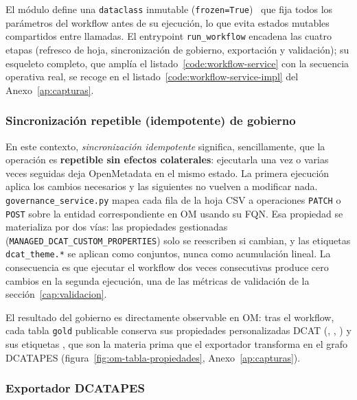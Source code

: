 El módulo  define una \texttt{dataclass} inmutable (\texttt{frozen=True})~\cite{pythonDataclasses} que fija todos los parámetros del workflow antes de su ejecución, lo que evita estados mutables compartidos entre llamadas. El entrypoint \texttt{run\_workflow} encadena las cuatro etapas (refresco de hoja, sincronización de gobierno, exportación y validación); su esqueleto completo, que amplía el listado~\ref{code:workflow-service} con la secuencia operativa real, se recoge en el listado~\ref{code:workflow-service-impl} del Anexo~\ref{ap:capturas}.

\subsubsection{Sincronización repetible (idempotente) de gobierno}

En este contexto, \emph{sincronización idempotente} significa, sencillamente, que la operación es \textbf{repetible sin efectos colaterales}: ejecutarla una vez o varias veces seguidas deja OpenMetadata en el mismo estado. La primera ejecución aplica los cambios necesarios y las siguientes no vuelven a modificar nada. \texttt{governance\_service.py} mapea cada fila de la hoja \ac{CSV} a operaciones \texttt{PATCH} o \texttt{POST} sobre la entidad correspondiente en \ac{OM} usando su \ac{FQN}. Esa propiedad se materializa por dos vías: las propiedades gestionadas (\texttt{MANAGED\_DCAT\_CUSTOM\_PROPERTIES}) solo se reescriben si cambian, y las etiquetas \texttt{dcat\_theme.*} se aplican como conjuntos, nunca como acumulación lineal. La consecuencia es que ejecutar el workflow dos veces consecutivas produce cero cambios en la segunda ejecución, una de las métricas de validación de la sección~\ref{cap:validacion}.

El resultado del gobierno es directamente observable en \ac{OM}: tras el workflow, cada tabla \texttt{gold} publicable conserva sus propiedades personalizadas DCAT (, , ) y sus etiquetas , que son la materia prima que el exportador transforma en el grafo \ac{DCATAPES} (figura~\ref{fig:om-tabla-propiedades}, Anexo~\ref{ap:capturas}).

\subsubsection{Exportador \texorpdfstring{\ac{DCATAPES}}{DCAT-AP-ES}}

